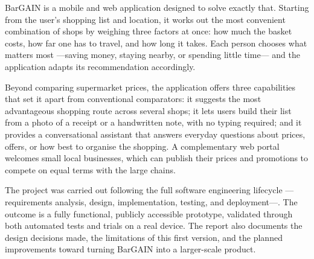 BarGAIN is a mobile and web application designed to solve exactly that. Starting from the user's
shopping list and location, it works out the most convenient combination of shops by weighing
three factors at once: how much the basket costs, how far one has to travel, and how long it
takes. Each person chooses what matters most ---saving money, staying nearby, or spending little
time--- and the application adapts its recommendation accordingly.

Beyond comparing supermarket prices, the application offers three capabilities that set it apart
from conventional comparators: it suggests the most advantageous shopping route across several
shops; it lets users build their list from a photo of a receipt or a handwritten note, with no
typing required; and it provides a conversational assistant that answers everyday questions about
prices, offers, or how best to organise the shopping. A complementary web portal welcomes small
local businesses, which can publish their prices and promotions to compete on equal terms with the
large chains.

The project was carried out following the full software engineering lifecycle ---requirements
analysis, design, implementation, testing, and deployment---. The outcome is a fully functional,
publicly accessible prototype, validated through both automated tests and trials on a real device.
The report also documents the design decisions made, the limitations of this first version, and
the planned improvements toward turning BarGAIN into a larger-scale product.
